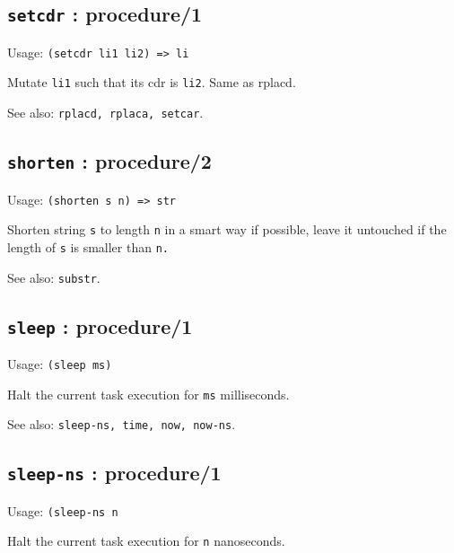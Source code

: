 \documentclass[
]{article}
\newcommand{\passthrough}[1]{#1}
\begin{document}
\hypertarget{setcdr-procedure1-1}{%
\subsection{\texorpdfstring{\texttt{setcdr} :
procedure/1}{setcdr : procedure/1}}\label{setcdr-procedure1-1}}

Usage: \passthrough{\lstinline!(setcdr li1 li2) => li!}

Mutate \passthrough{\lstinline!li1!} such that its cdr is
\passthrough{\lstinline!li2!}. Same as rplacd.

See also: \passthrough{\lstinline!rplacd, rplaca, setcar!}.

\hypertarget{shorten-procedure2-1}{%
\subsection{\texorpdfstring{\texttt{shorten} :
procedure/2}{shorten : procedure/2}}\label{shorten-procedure2-1}}

Usage: \passthrough{\lstinline!(shorten s n) => str!}

Shorten string \passthrough{\lstinline!s!} to length
\passthrough{\lstinline!n!} in a smart way if possible, leave it
untouched if the length of \passthrough{\lstinline!s!} is smaller than
\passthrough{\lstinline!n.!}

See also: \passthrough{\lstinline!substr!}.

\hypertarget{sleep-procedure1-1}{%
\subsection{\texorpdfstring{\texttt{sleep} :
procedure/1}{sleep : procedure/1}}\label{sleep-procedure1-1}}

Usage: \passthrough{\lstinline!(sleep ms)!}

Halt the current task execution for \passthrough{\lstinline!ms!}
milliseconds.

See also: \passthrough{\lstinline!sleep-ns, time, now, now-ns!}.

\hypertarget{sleep-ns-procedure1-1}{%
\subsection{\texorpdfstring{\texttt{sleep-ns} :
procedure/1}{sleep-ns : procedure/1}}\label{sleep-ns-procedure1-1}}

Usage: \passthrough{\lstinline!(sleep-ns n!}

Halt the current task execution for \passthrough{\lstinline!n!}
nanoseconds.
\end{document}
